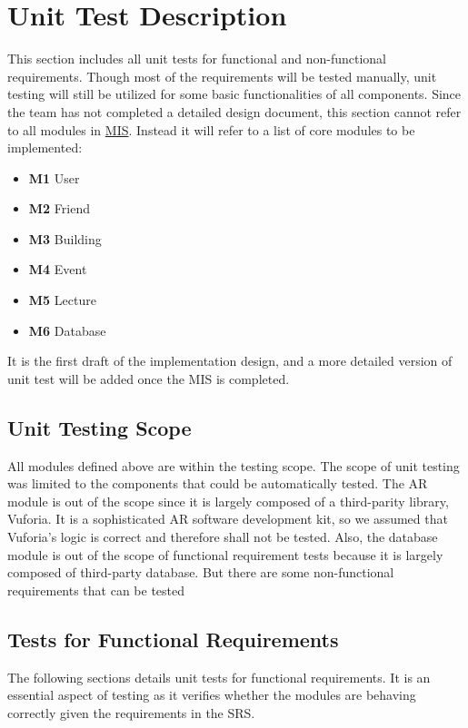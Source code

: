 \documentclass[12pt, titlepage]{article}
\begin{document}
\section{Unit Test Description}
\label{sec:unit}

This section includes all unit tests for functional and non-functional requirements. Though most of the requirements will be tested manually, unit testing will still be utilized for some basic functionalities of all components. Since the team has not completed a detailed design document, this section cannot refer to all modules in \href{https://github.com/beatlepie/4G06CapstoneProjectTeam2/blob/main/docs/Design/SoftDetailedDes/MIS.pdf}{MIS}. Instead it will refer to a list of core modules to be implemented:
\begin{itemize}
	\item \textbf{M1} User
	\item \textbf{M2} Friend
	\item \textbf{M3} Building
	\item \textbf{M4} Event
	\item \textbf{M5} Lecture
	\item \textbf{M6} Database
\end{itemize}
It is the first draft of the implementation design, and a more detailed version of unit test will be added once the MIS is completed.

\subsection{Unit Testing Scope}

All modules defined above are within the testing scope.  The scope of unit testing was limited to the components that could be automatically tested. The AR module is out of the scope since it is largely composed of a third-parity library, Vuforia. It is a sophisticated AR software development kit, so we assumed that Vuforia’s logic is correct and therefore shall not be tested. Also, the database module is out of the scope of functional requirement tests because it is largely composed of third-party database. But there are some non-functional requirements that can be tested

\subsection{Tests for Functional Requirements}

The following sections details unit tests for functional requirements. It is an essential aspect of testing as it verifies whether the modules are behaving
correctly given the requirements in the SRS.
\end{document}
